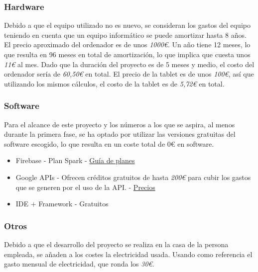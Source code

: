 \documentclass[a4paper, 12pt]{article}
\begin{document}
\subsubsection{Hardware}

Debido a que el equipo utilizado no es nuevo, se consideran los gastos del equipo teniendo en cuenta que un equipo informático se puede amortizar hasta 8 años. El precio aproximado del ordenador es de unos \textit{1000€}. Un año tiene 12 meses, lo que resulta en 96 meses en total de amortización, lo que implica que cuesta unos \textit{11€} al mes. Dado que la duración del proyecto es de 5 meses y medio, el costo del ordenador sería de \textit{60,50€} en total. El precio de la tablet es de unos \textit{100€}, así que utilizando los mismos cálculos, el costo de la tablet es de \textit{5,72€} en total.

\subsubsection{Software}

Para el alcance de este proyecto y los números a los que se aspira, al menos durante la primera fase, se ha optado por utilizar las versiones gratuitas del software escogido, lo que resulta en un coste total de 0€ en software.

\begin{itemize}[noitemsep]
	\item Firebase - Plan Spark - \href{https://firebase.google.com/pricing?hl=es-419}{Guía de planes} \cite{firebase_plans}
	\item Google APIs - Ofrecen créditos gratuitos de hasta \textit{200€} para cubir los gastos que se generen por el uso de la API. - \href{https://mapsplatform.google.com/intl/es/pricing/}{Precios}\cite{google_prices}
	\item IDE + Framework - Gratuitos
\end{itemize}


\subsubsection{Otros}

Debido a que el desarrollo del proyecto se realiza en la casa de la persona empleada, se añaden a los costes la electricidad usada. Usando como referencia el gasto mensual de electricidad, que ronda los \textit{30€}.
\end{document}
